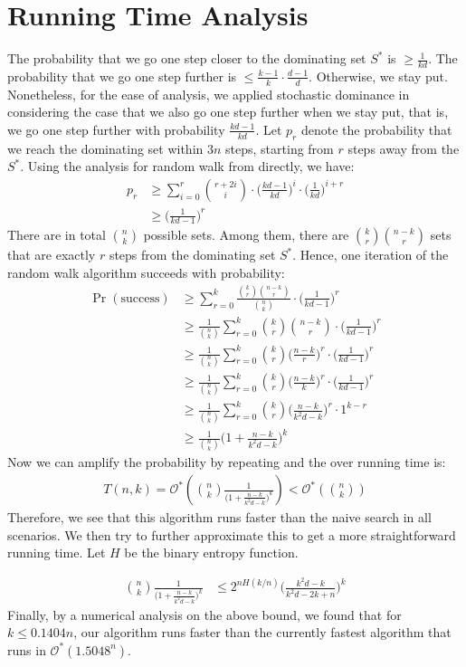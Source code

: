 \documentclass{article}
\begin{document}
\section{Running Time Analysis}
The probability that we go one step closer to the dominating set $S^*$ is $\geq \frac{1}{kd}$. The probability that we go one step further is $\leq \frac{k-1}{k} \cdot \frac{d-1}{d}$. Otherwise, we stay put. Nonetheless, for the ease of analysis, we applied stochastic dominance in considering the case that we also go one step further when we stay put, that is, we go one step further with probability $\frac{kd-1}{kd}$. Let $p_r$ denote the probability that we reach the dominating set within $3n$ steps, starting from $r$ steps away from the $S^*$. Using the analysis  for random walk from \cite{Schoning99} directly, we have:
\begin{align*}
p_r &\geq \sum_{i = 0}^r {r+2i \choose i} \cdot \Big(\frac{kd-1}{kd}\Big)^i \cdot \Big(\frac{1}{kd}\Big)^{i+r} \\
&\geq \Big(\frac{1}{kd-1}\Big)^r
\end{align*}
There are in total ${n \choose k}$ possible sets. Among them, there are ${k \choose r}{n-k \choose r}$ sets that are exactly $r$ steps from the dominating set $S^*$. Hence, one iteration of the random walk algorithm succeeds with probability:
\begin{align*}
\Pr(\text{success}) &\geq \sum_{r = 0}^{k} \frac{{k \choose r}{n-k \choose r}}{{n \choose k}} \cdot \Big(\frac{1}{kd - 1}\Big)^r \\
&\geq \frac{1}{{n \choose k}} \sum_{r = 0}^k {k \choose r}{n-k \choose r} \cdot \Big(\frac{1}{kd - 1}\Big)^r \\
&\geq \frac{1}{{n \choose k}} \sum_{r = 0}^k {k \choose r}\Big(\frac{n-k}{r}\Big)^r \cdot \Big(\frac{1}{kd-1}\Big)^r \\
&\geq \frac{1}{{n \choose k}} \sum_{r = 0}^k {k \choose r}\Big(\frac{n-k}{k}\Big)^r \cdot \Big(\frac{1}{kd-1}\Big)^r \\
&\geq \frac{1}{{n \choose k}} \sum_{r = 0}^k {k \choose r} \Big(\frac{n-k}{k^2d - k}\Big)^r \cdot 1^{k-r} \\
&\geq \frac{1}{{n \choose k}} \Big(1 + \frac{n-k}{k^2d - k}\Big)^k
\end{align*}
Now we can amplify the probability by repeating and the over running time is:
\begin{align*}
T(n,k) = \mathcal{O}^*\left({n \choose k}\frac{1}{\Big(1 + \frac{n-k}{k^2d - k}\Big)^k}\right) < \mathcal{O}^*\left({n \choose k}\right)
\end{align*}
Therefore, we see that this algorithm runs faster than the naive search in all scenarios. We then try to further approximate this to get a more straightforward running time. Let $H$ be the binary entropy function. \par
\begin{align*}
{n \choose k}\frac{1}{\Big(1 + \frac{n-k}{k^2d - k}\Big)^k} &\leq 2^{nH(k/n)} \Big(\frac{k^2d - k}{k^2d - 2k + n}\Big)^k 
\end{align*}
Finally, by a numerical analysis on the above bound, we found that for $k \leq 0.1404n$, our algorithm runs faster than the currently fastest algorithm that runs in $\mathcal{O}^*(1.5048^n)$\cite{Rooij}.
\end{document}
